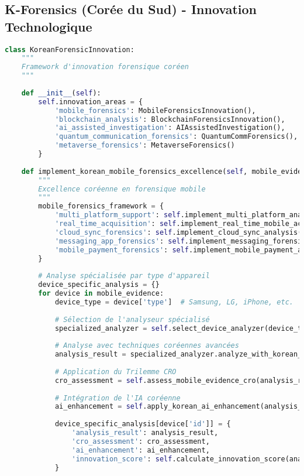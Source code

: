 \subsection{K-Forensics (Corée du Sud) - Innovation Technologique}

\begin{lstlisting}[language=Python, caption=Framework coréen d'innovation forensique]
class KoreanForensicInnovation:
    """
    Framework d'innovation forensique coréen
    """
    
    def __init__(self):
        self.innovation_areas = {
            'mobile_forensics': MobileForensicsInnovation(),
            'blockchain_analysis': BlockchainForensicsInnovation(),
            'ai_assisted_investigation': AIAssistedInvestigation(),
            'quantum_communication_forensics': QuantumCommForensics(),
            'metaverse_forensics': MetaverseForensics()
        }
        
    def implement_korean_mobile_forensics_excellence(self, mobile_evidence):
        """
        Excellence coréenne en forensique mobile
        """
        mobile_forensics_framework = {
            'multi_platform_support': self.implement_multi_platform_analysis(),
            'real_time_acquisition': self.implement_real_time_mobile_acquisition(),
            'cloud_sync_forensics': self.implement_cloud_sync_analysis(),
            'messaging_app_forensics': self.implement_messaging_forensics(),
            'mobile_payment_forensics': self.implement_mobile_payment_analysis()
        }
        
        # Analyse spécialisée par type d'appareil
        device_specific_analysis = {}
        for device in mobile_evidence:
            device_type = device['type']  # Samsung, LG, iPhone, etc.
            
            # Sélection de l'analyseur spécialisé
            specialized_analyzer = self.select_device_analyzer(device_type)
            
            # Analyse avec techniques coréennes avancées
            analysis_result = specialized_analyzer.analyze_with_korean_methods(device)
            
            # Application du Trilemme CRO
            cro_assessment = self.assess_mobile_evidence_cro(analysis_result)
            
            # Intégration de l'IA coréenne
            ai_enhancement = self.apply_korean_ai_enhancement(analysis_result)
            
            device_specific_analysis[device['id']] = {
                'analysis_result': analysis_result,
                'cro_assessment': cro_assessment,
                'ai_enhancement': ai_enhancement,
                'innovation_score': self.calculate_innovation_score(analysis_result)
            }
            

\end{lstlisting}
